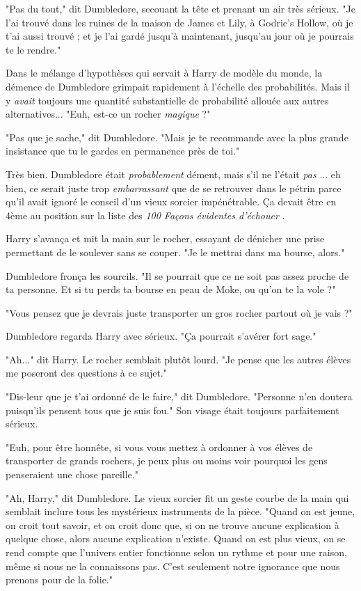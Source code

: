 "Pas du tout," dit Dumbledore, secouant la tête et prenant un air très sérieux. "Je l'ai trouvé dans les ruines de la maison de James et Lily, à Godric's Hollow, où je t'ai aussi trouvé ; et je l'ai gardé jusqu'à maintenant, jusqu'au jour où je pourrais te le rendre."

Dans le mélange d'hypothèses qui servait à Harry de modèle du monde, la démence de Dumbledore grimpait rapidement à l'échelle des probabilités. Mais il y \emph{avait}  toujours une quantité substantielle de probabilité allouée aux autres alternatives... "Euh, est-ce un rocher \emph{magique}  ?"

"Pas que je sache," dit Dumbledore. "Mais je te recommande avec la plus grande insistance que tu le gardes en permanence près de toi."

Très bien. Dumbledore était \emph{probablement}  dément, mais s'il ne l'était \emph{pas} ... eh bien, ce serait juste trop \emph{embarrassant}  que de se retrouver dans le pétrin parce qu'il avait ignoré le conseil d'un vieux sorcier impénétrable. Ça devait être en 4ème au position sur la liste des \emph{100 Façons évidentes d'échouer} .

Harry s'avança et mit la main sur le rocher, essayant de dénicher une prise permettant de le soulever sans se couper. "Je le mettrai dans ma bourse, alors."

Dumbledore fronça les sourcils. "Il se pourrait que ce ne soit pas assez proche de ta personne. Et si tu perds ta bourse en peau de Moke, ou qu'on te la vole ?"

"Vous pensez que je devrais juste transporter un gros rocher partout où je vais ?"

Dumbledore regarda Harry avec sérieux. "Ça pourrait s'avérer fort sage."

"Ah..." dit Harry. Le rocher semblait plutôt lourd. "Je pense que les autres élèves me poseront des questions à ce sujet."

"Dis-leur que je t'ai ordonné de le faire," dit Dumbledore. "Personne n'en doutera puisqu'ils pensent tous que je suis fou." Son visage était toujours parfaitement sérieux.

"Euh, pour être honnête, si vous vous mettez à ordonner à vos élèves de transporter de grands rochers, je peux plus ou moins voir pourquoi les gens penseraient une chose pareille."

"Ah, Harry," dit Dumbledore. Le vieux sorcier fit un geste courbe de la main qui semblait inclure tous les mystérieux instruments de la pièce. "Quand on est jeune, on croit tout savoir, et on croit donc que, si on ne trouve aucune explication à quelque chose, alors aucune explication n'existe. Quand on est plus vieux, on se rend compte que l'univers entier fonctionne selon un rythme et pour une raison, même si nous ne la connaissons pas. C'est seulement notre ignorance que nous prenons pour de la folie."

